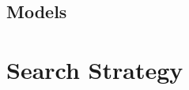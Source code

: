 \documentclass[compress, serif]{beamer}
\begin{document}
\subsection{Models}
%
%
%

\section{Search Strategy}
\end{document}
